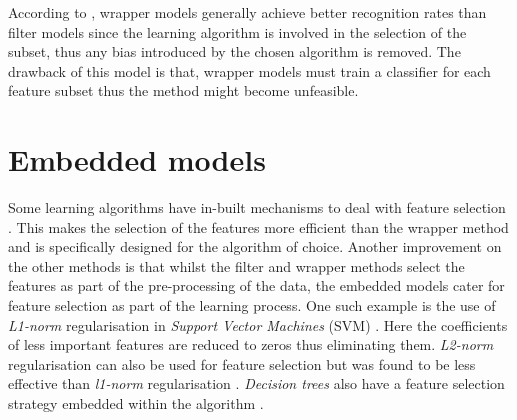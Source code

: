 According to \citet{sammut2017encyclopedia}, wrapper models generally achieve better recognition rates than filter models since the learning algorithm is involved in the selection of the subset, thus any bias introduced by the chosen algorithm is removed. The drawback of this model is that, wrapper models must train a classifier for each feature subset thus the method might become unfeasible.

\section{Embedded models}\label{sec:fs_filter}
Some learning algorithms have in-built mechanisms to deal with feature selection \citep{guyon2003introduction,sammut2017encyclopedia}. This makes the selection of the features more efficient than the wrapper method and is specifically designed for the algorithm of choice. Another improvement on the other methods is that whilst the filter and wrapper methods select the features as part of the pre-processing of the data, the embedded models cater for feature selection as part of the learning process. One such example is the use of \textit{L1-norm} regularisation in \textit{Support Vector Machines} (SVM) \citep{guyon2003introduction,de2015feature}. Here the coefficients of less important features are reduced to zeros thus eliminating them. \textit{L2-norm} regularisation can also be used for feature selection but was found to be less effective than \textit{l1-norm} regularisation \citep{de2015grammar}. \textit{Decision trees} also have a feature selection strategy embedded within the algorithm \citep{garcia2015data}.

